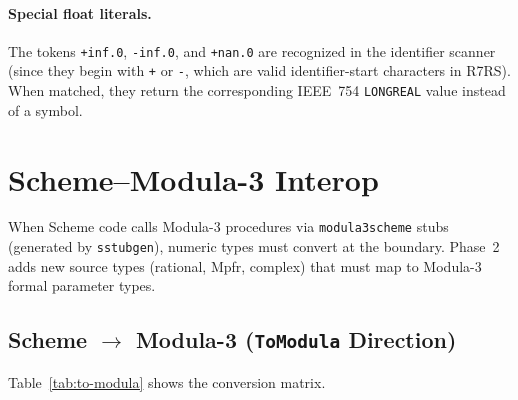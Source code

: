 \documentclass[12pt]{article}
\begin{document}
\paragraph{Special float literals.}
The tokens {\tt +inf.0}, {\tt -inf.0}, and {\tt +nan.0} are
recognized in the identifier scanner (since they begin with
{\tt +} or {\tt -}, which are valid identifier-start characters
in R7RS).  When matched, they return the corresponding IEEE~754
{\tt LONGREAL} value instead of a symbol.

\section{Scheme--Modula-3 Interop}
\label{sec:interop}

When Scheme code calls Modula-3 procedures via {\tt modula3scheme}
stubs (generated by {\tt sstubgen}), numeric types must convert at
the boundary.  Phase~2 adds new source types (rational, Mpfr,
complex) that must map to Modula-3 formal parameter types.

\subsection{Scheme $\to$ Modula-3 ({\tt ToModula} Direction)}

Table~\ref{tab:to-modula} shows the conversion matrix.
\end{document}
